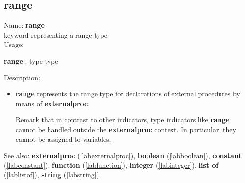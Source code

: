 \subsection{range}
\label{labrange}
\noindent Name: \textbf{range}\\
keyword representing a \textsf{range} type \\
\noindent Usage: 
\begin{center}
\textbf{range} : \textsf{type type}\\
\end{center}
\noindent Description: \begin{itemize}

\item \textbf{range} represents the \textsf{range} type for declarations
   of external procedures by means of \textbf{externalproc}.
    
   Remark that in contrast to other indicators, type indicators like
   \textbf{range} cannot be handled outside the \textbf{externalproc} context.  In
   particular, they cannot be assigned to variables.
\end{itemize}
See also: \textbf{externalproc} (\ref{labexternalproc}), \textbf{boolean} (\ref{labboolean}), \textbf{constant} (\ref{labconstant}), \textbf{function} (\ref{labfunction}), \textbf{integer} (\ref{labinteger}), \textbf{list of} (\ref{lablistof}), \textbf{string} (\ref{labstring})
